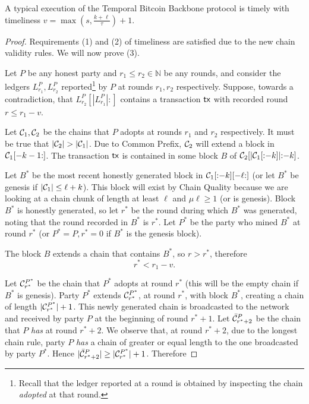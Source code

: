 \begin{theorem}
  A typical execution of the Temporal Bitcoin Backbone protocol is timely
  with timeliness $v = \max(s, \frac{k + \ell}{\tau}) + 1$.
\end{theorem}
\begin{proof}
  Requirements (1) and (2) of timeliness are satisfied due to the new chain validity rules.
  We will now prove (3).

  Let $P$ be any honest party and $r_1 \leq r_2 \in \mathbb{N}$ be any rounds, and consider
  the ledgers $L^P_{r_1}, L^P_{r_2}$ reported\footnote{
    Recall that the ledger reported at a round is obtained by inspecting the
    chain \emph{adopted} at that round.
  } by $P$ at rounds $r_1, r_2$ respectively.
  Suppose, towards a contradiction, that $L^P_{r_2}[|L^P_{r_1}|{:}]$ contains a transaction
  $\textsf{tx}$ with recorded round $r \leq r_1 - v$.

  Let $\mathcal{C}_1, \mathcal{C}_2$ be the chains that $P$ adopts at rounds $r_1$
  and $r_2$ respectively.
  It must be true that $|\mathcal{C}_2| > |\mathcal{C}_1|$.
  Due to Common Prefix, $\mathcal{C}_2$ will extend a block in $\mathcal{C}_1[-k-1{:}]$.
  The transaction $\textsf{tx}$ is contained in some block $B$ of $\mathcal{C}_2[|\mathcal{C}_1[{:}{-k}]|{:}{-k}]$.

  Let $B^*$ be the most recent
  honestly generated block in $\mathcal{C}_1[{:}{-k}][{-\ell}{:}]$
  (or let $B^*$ be genesis if $|\mathcal{C}_1| \leq \ell + k$).
  This block will exist by
  Chain Quality because we are looking at a chain chunk of length at least $\ell$ and
  $\mu\ell \geq 1$ (or is genesis).
  Block $B^*$ is honestly generated, so let $r^*$ be the round
  during which $B^*$ was generated, noting that the round recorded in $B^*$ is $r^*$.
  Let $P^*$ be the party who mined $B^*$ at round $r^*$ (or $P^* = P, r^* = 0$ if $B^*$ is
  the genesis block).

  The block $B$ extends a chain that contains $B^*$, so $r > r^*$,
  therefore
  \begin{equation}
    r^* < r_1 - v\label{eq:bitcoin-r-bound}.
  \end{equation}

  Let $\mathcal{C}^{P^*}_{r^*}$ be the chain that $P^*$ adopts at
  round $r^*$ (this will be the empty chain if $B^*$ is genesis).
  Party $P^*$ extends $\mathcal{C}^{P^*}_{r^*}$, at round $r^*$, with block $B^*$,
  creating a chain of length $|\mathcal{C}^{P^*}_{r^*}| + 1$.
  This newly generated chain is broadcasted to the network and
  received by party $P$ at the beginning of round $r^* + 1$.
  Let $\bar {\mathcal{C}}^P_{r^* + 2}$ be the chain
  that $P$ \emph{has} at round $r^* + 2$.
  We observe that, at round $r^* + 2$, due to the
  longest chain rule, party $P$ \emph{has} a chain of greater or equal
  length to the one broadcasted by party $P^*$. Hence
  $|\bar {\mathcal{C}}^P_{r^* + 2}| \geq |\mathcal{C}^{P^*}_{r^*}| + 1$. Therefore


\end{proof}
